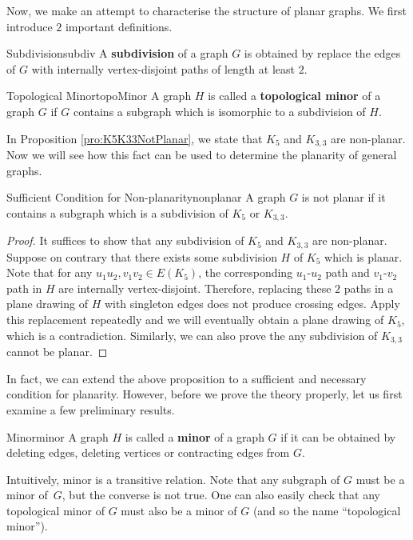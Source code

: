 \documentclass[math]{amznotes}
\theoremstyle{remark}
\begin{document}
Now, we make an attempt to characterise the structure of planar graphs. We first introduce $2$ important definitions.
\begin{dfnbox}{Subdivision}{subdiv}
    A {\color{red} \textbf{subdivision}} of a graph $G$ is obtained by replace the edges of $G$ with internally vertex-disjoint paths of length at least $2$.
\end{dfnbox}
\begin{dfnbox}{Topological Minor}{topoMinor}
    A graph $H$ is called a {\color{red} \textbf{topological minor}} of a graph $G$ if $G$ contains a subgraph which is isomorphic to a subdivision of $H$.
\end{dfnbox}
In Proposition \ref{pro:K5K33NotPlanar}, we state that $K_5$ and $K_{3, 3}$ are non-planar. Now we will see how this fact can be used to determine the planarity of general graphs.
\begin{probox}{Sufficient Condition for Non-planarity}{nonplanar}
    A graph $G$ is not planar if it contains a subgraph which is a subdivision of $K_5$ or $K_{3, 3}$.
    \tcblower
    \begin{proof}
        It suffices to show that any subdivision of $K_5$ and $K_{3, 3}$ are non-planar. Suppose on contrary that there exists some subdivision $H$ of $K_5$ which is planar. Note that for any $u_1u_2, v_1v_2 \in E(K_5)$, the corresponding $u_1$-$u_2$ path and $v_1$-$v_2$ path in $H$ are internally vertex-disjoint. Therefore, replacing these $2$ paths in a plane drawing of $H$ with singleton edges does not produce crossing edges. Apply this replacement repeatedly and we will eventually obtain a plane drawing of $K_5$, which is a contradiction. Similarly, we can also prove the any subdivision of $K_{3, 3}$ cannot be planar.
    \end{proof}
\end{probox}
In fact, we can extend the above proposition to a sufficient and necessary condition for planarity. However, before we prove the theory properly, let us first examine a few preliminary results.
\begin{dfnbox}{Minor}{minor}
    A graph $H$ is called a {\color{red} \textbf{minor}} of a graph $G$ if it can be obtained by deleting edges, deleting vertices or contracting edges from $G$.
\end{dfnbox}
Intuitively, minor is a transitive relation. Note that any subgraph of $G$ must be a minor of~$G$, but the converse is not true. One can also easily check that any topological minor of $G$ must also be a minor of $G$ (and so the name ``topological minor''). 
\end{document}
